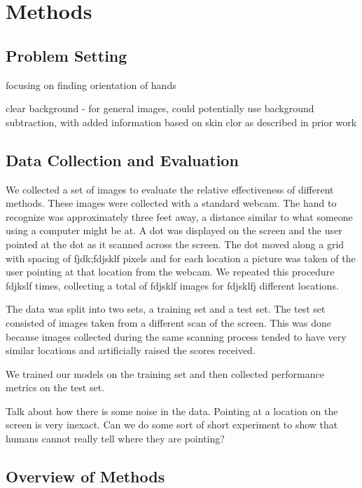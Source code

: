 \documentclass[10pt,twocolumn,letterpaper]{article}
\begin{document}
\section{Methods}

\subsection{Problem Setting} %

focusing on finding orientation of hands

clear background - for general images, could potentially use background subtraction, with added information based on skin clor as described in prior work

\subsection{Data Collection and Evaluation}

We collected a set of images to evaluate the relative effectiveness of different methods.  These images were collected with a standard webcam.  The hand to recognize was approximately three feet away, a distance similar to what someone using a computer might be at.  A dot was displayed on the screen and the user pointed at the dot as it scanned across the screen.  The dot moved along a grid with spacing of fjdk;fdjsklf pixels and for each location a picture was taken of the user pointing at that location from the webcam.  We repeated this procedure fdjkslf times, collecting a total of fdjsklf images for fdjsklfj different locations.

The data was split into two sets, a training set and a test set.  The test set consisted of images taken from a different scan of the screen.  This was done because images collected during the same scanning process tended to have very similar locations and artificially raised the scores received.

We trained our models on the training set and then collected performance metrics on the test set.

Talk about how there is some noise in the data.  Pointing at a location on the screen is very inexact.  Can we do some sort of short experiment to show that humans cannot really tell where they are pointing?

\subsection{Overview of Methods}
\end{document}
